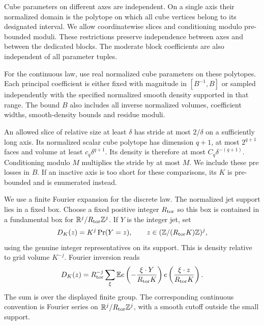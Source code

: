 Cube parameters on different axes are independent. On a single
axis their normalized domain is the polytope on which all cube
vertices belong to its designated interval. We allow
coordinatewise slices and conditioning modulo pre-bounded
moduli. These restrictions preserve independence between axes
and between the dedicated blocks. The moderate block
coefficients are also independent of all parameter tuples.

For the continuous law, use real normalized cube parameters on
these polytopes. Each principal coefficient is either fixed
with magnitude in $[B^{-1},B]$ or sampled independently with the
specified normalized smooth density supported in that range.
The bound $B$ also includes all inverse normalized volumes,
coefficient widths, smooth-density bounds and residue moduli.

An allowed slice of relative size at least $\delta$ has stride
at most $2/\delta$ on a sufficiently long axis. Its normalized
scalar cube polytope has dimension $q+1$, at most $2^{q+1}$
faces and volume at least $c_q\delta^{q+1}$. Its density is
therefore at most $C_q\delta^{-(q+1)}$. Conditioning modulo $M$
multiplies the stride by at most $M$. We include these pre
losses in $B$. If an inactive axis is too short for these
comparisons, its $K$ is pre-bounded and is enumerated instead.

We use a finite Fourier expansion for the discrete law. The
normalized jet support lies in a fixed box. Choose a fixed
positive integer $R_{\rm tor}$ so this box is contained in a
fundamental box for $\mathbb R^j/R_{\rm tor}\mathbb Z^j$. If $Y$ is the
integer jet, set
\[
 D_K(z)=K^j\Pr(Y=z),
 \qquad z\in(\mathbb Z/(R_{\rm tor}K)\mathbb Z)^j,
\]
using the genuine integer representatives on its support.
This is density relative to grid volume $K^{-j}$. Fourier
inversion reads
\[
 D_K(z)=R_{\rm tor}^{-j}\sum_\xi
 \mathbb E e\left(-\frac{\xi\cdot Y}{R_{\rm tor}K}\right)
                 e\left(\frac{\xi\cdot z}{R_{\rm tor}K}\right).
\]
The sum is over the displayed finite group. The corresponding
continuous convention is Fourier series on
$\mathbb R^j/R_{\rm tor}\mathbb Z^j$, with a smooth cutoff outside the
small support.

